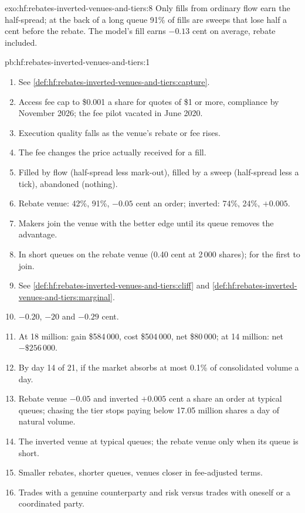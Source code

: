 \begin{solution}{exo:hf:rebates-inverted-venues-and-tiers:8}
Only fills from ordinary flow earn the half-spread; at the back of a long queue 91\% of fills are sweeps that lose half a cent before the rebate. The
model's fill earns $-0.13$ cent on average, rebate included.
\end{solution}

\begin{solution}{pb:hf:rebates-inverted-venues-and-tiers:1}
\begin{enumerate}
\item See \cref{def:hf:rebates-inverted-venues-and-tiers:capture}.
\item Access fee cap to \$0.001 a share for quotes of \$1 or more, compliance by November 2026; the fee pilot vacated in June 2020.
\item Execution quality falls as the venue's rebate or fee rises.
\item The fee changes the price actually received for a fill.
\item Filled by flow (half-spread less mark-out), filled by a sweep (half-spread less a tick), abandoned (nothing).
\item Rebate venue: 42\%, 91\%, $-0.05$ cent an order; inverted: 74\%, 24\%, $+0.005$.
\item Makers join the venue with the better edge until its queue removes the advantage.
\item In short queues on the rebate venue (0.40 cent at 2\,000 shares); for the first to join.
\item See \cref{def:hf:rebates-inverted-venues-and-tiers:cliff} and \cref{def:hf:rebates-inverted-venues-and-tiers:marginal}.
\item $-0.20$, $-20$ and $-0.29$ cent.
\item At 18 million: gain \$584\,000, cost \$504\,000, net \$80\,000; at 14 million: net $-\$256\,000$.
\item By day 14 of 21, if the market absorbs at most 0.1\% of consolidated volume a day.
\item Rebate venue $-0.05$ and inverted $+0.005$ cent a share an order at typical queues; chasing the tier stops paying below 17.05 million shares a
day of natural volume.
\item The inverted venue at typical queues; the rebate venue only when its queue is short.
\item Smaller rebates, shorter queues, venues closer in fee-adjusted terms.
\item Trades with a genuine counterparty and risk versus trades with oneself or a coordinated party.

\end{enumerate}
\end{solution}
